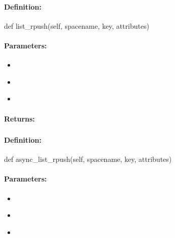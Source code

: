 \paragraph{Definition:}
\begin{pythoncode}
def list_rpush(self, spacename, key, attributes)
\end{pythoncode}

\paragraph{Parameters:}
\begin{itemize}[noitemsep]
\item {}\\

\item {}\\

\item {}\\

\end{itemize}

\paragraph{Returns:}


\pagebreak
\subsubsection{}
\label{api:python:async_list_rpush}


\paragraph{Definition:}
\begin{pythoncode}
def async_list_rpush(self, spacename, key, attributes)
\end{pythoncode}

\paragraph{Parameters:}
\begin{itemize}[noitemsep]
\item {}\\

\item {}\\

\item {}\\

\end{itemize}

